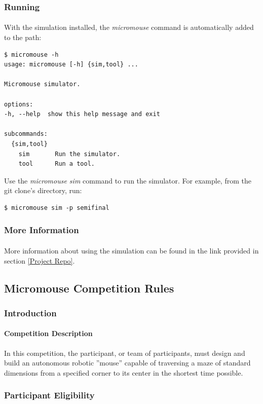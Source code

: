 \documentclass[12pt]{article}
\begin{document}
\subsubsection{Running}
\paragraph{}
With the simulation installed, the \textit{micromouse} command is automatically added to the path:
\begin{verbatim}
$ micromouse -h
usage: micromouse [-h] {sim,tool} ...

Micromouse simulator.

options:
-h, --help  show this help message and exit

subcommands:
  {sim,tool}
    sim       Run the simulator.
    tool      Run a tool.
\end{verbatim}

Use the \textit{micromouse sim} command to run the simulator.
For example, from the git clone's directory, run:
\begin{verbatim}
$ micromouse sim -p semifinal
\end{verbatim}

\subsubsection{More Information}
\paragraph{}
More information about using the simulation can be found in the link provided in section \ref{Project Repo}.

\subsection{Micromouse Competition Rules}
\subsubsection{Introduction}
\paragraph{Competition Description}
In this competition, the participant, or team of participants, must design and build an
autonomous robotic ”mouse” capable of traversing a maze of standard dimensions from
a specified corner to its center in the shortest time possible.
\subsubsection{Participant Eligibility}
\end{document}
